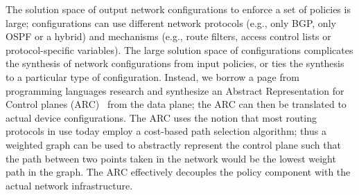 The solution space of output network configurations to 
enforce a set of policies
is large; configurations can use different 
network protocols (e.g., only BGP, only OSPF or a hybrid) and
mechanisms (e.g., route filters, access control lists
or protocol-specific variables). The large solution space
of configurations complicates the synthesis of
network configurations from
input policies, 
or ties the synthesis to a particular type of configuration. 
Instead, we borrow a page from programming languages
research and
synthesize an Abstract Representation for Control planes (ARC)~\cite{arc} 
from the data plane; the ARC can then be translated to actual device configurations.
The ARC uses the notion that most routing protocols in use 
today employ a cost-based path selection algorithm; thus a weighted
graph can be used to abstractly represent the control plane such that 
the path between two points taken in the network would be 
the lowest weight path in the graph. 
The ARC effectively decouples the policy component with the 
actual network infrastructure. 





